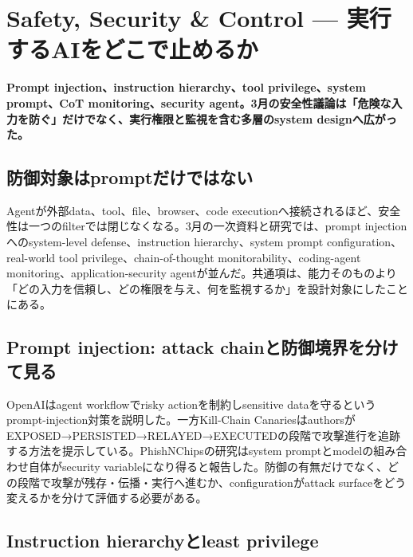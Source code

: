 \section{Safety, Security \& Control — 実行するAIをどこで止めるか}
\label{pkg:safety-security-control-march}
\noindent\textbf{Prompt injection、instruction hierarchy、tool privilege、system prompt、CoT monitoring、security agent。3月の安全性議論は「危険な入力を防ぐ」だけでなく、実行権限と監視を含む多層のsystem designへ広がった。}\autocite{src-18b7ee4fe5e4,src-3dec299964e6,src-87dacccfecfd,src-b4b340379768}

\subsection{防御対象はpromptだけではない}

Agentが外部data、tool、file、browser、code executionへ接続されるほど、安全性は一つのfilterでは閉じなくなる。3月の一次資料と研究では、prompt injectionへのsystem-level defense、instruction hierarchy、system prompt configuration、real-world tool privilege、chain-of-thought monitorability、coding-agent monitoring、application-security agentが並んだ。共通項は、能力そのものより「どの入力を信頼し、どの権限を与え、何を監視するか」を設計対象にしたことにある。\autocite{src-18b7ee4fe5e4,src-287a6bf67154,src-3dec299964e6,src-549bffaad22c,src-5becf449a527,src-87dacccfecfd,src-b4b340379768,src-e627c8192172}


\subsection{Prompt injection: attack chainと防御境界を分けて見る}

OpenAIはagent workflowでrisky actionを制約しsensitive dataを守るというprompt-injection対策を説明した。一方Kill-Chain CanariesはauthorsがEXPOSED→PERSISTED→RELAYED→EXECUTEDの段階で攻撃進行を追跡する方法を提示している。PhishNChipsの研究はsystem promptとmodelの組み合わせ自体がsecurity variableになり得ると報告した。防御の有無だけでなく、どの段階で攻撃が残存・伝播・実行へ進むか、configurationがattack surfaceをどう変えるかを分けて評価する必要がある。\autocite{src-3dec299964e6,src-87dacccfecfd,src-e627c8192172}


\subsection{Instruction hierarchyとleast privilege}


